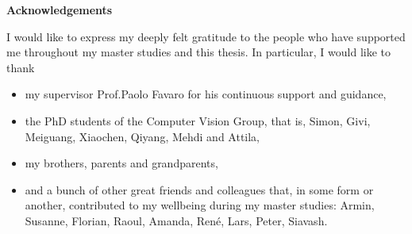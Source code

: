 \thispagestyle{empty}
\vspace{8cm}
\noindent
{\centerline {\bf \large Acknowledgements}}
\vspace{1cm}

\noindent
I would like to express my deeply felt gratitude to the people who have supported me throughout my master studies and this thesis.
In particular, I would like to thank 

\begin{itemize}
	\item my supervisor Prof.\@ Paolo Favaro for his continuous support and guidance,
	
	\item the PhD students of the Computer Vision Group, that is, Simon, Givi, Meiguang, Xiaochen, Qiyang, Mehdi and Attila, 
	
	\item my brothers, parents and grandparents, 
	
	\item and a bunch of other great friends and colleagues that, in some form or another, contributed to my wellbeing during my master studies: Armin, Susanne, Florian, Raoul, Amanda, Ren\'e, Lars, Peter, Siavash.
	
\end{itemize}

